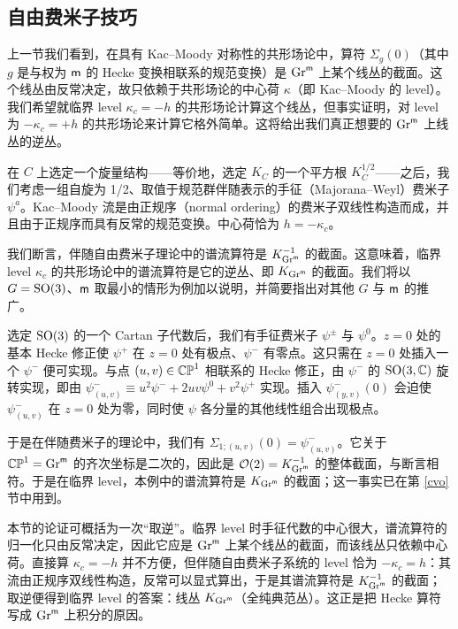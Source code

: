 \subsection{自由费米子技巧}\label{fft}

上一节我们看到，在具有 Kac--Moody 对称性的共形场论中，算符 $\Sigma_g(0)$（其中 $g$ 是与权为 ${\sf m}$ 的 Hecke 变换相联系的规范变换）是 ${\mathrm{Gr}}^{\sf m}$ 上某个线丛的截面。这个线丛由反常决定，故只依赖于共形场论的中心荷 $\kappa$（即 Kac--Moody 的 level）。我们希望就临界 level $\kappa_c=-h$ 的共形场论计算这个线丛，但事实证明，对 level 为 $-\kappa_c=+h$ 的共形场论来计算它格外简单。这将给出我们真正想要的 ${\mathrm{Gr}}^{\sf m}$ 上线丛的逆丛。
 
在 $C$ 上选定一个旋量结构——等价地，选定 $K_C$ 的一个平方根 $K_C^{1/2}$——之后，我们考虑一组自旋为 1/2、取值于规范群伴随表示的手征（Majorana--Weyl）费米子 $\psi^a$。Kac--Moody 流是由正规序（normal ordering）的费米子双线性构造而成，并且由于正规序而具有反常的规范变换。中心荷恰为 $h=-\kappa_c$。

我们断言，伴随自由费米子理论中的谱流算符是 $K^{-1}_{{\mathrm{Gr}}^{\sf m}}$ 的截面。这意味着，临界 level $\kappa_c$ 的共形场论中的谱流算符是它的逆丛、即 $K_{{\mathrm{Gr}}^{\sf m}}$ 的截面。我们将以 $G={\mathrm{SO}}(3)$、${\sf m}$ 取最小的情形为例加以说明，并简要指出对其他 $G$ 与 ${\sf m}$ 的推广。


选定 ${\mathrm{SO}}(3)$ 的一个 Cartan 子代数后，我们有手征费米子 $\psi^\pm$ 与 $\psi^0$。$z=0$ 处的基本 Hecke 修正使 $\psi^+$ 在 $z=0$ 处有极点、$\psi^-$ 有零点。这只需在 $z=0$ 处插入一个 $\psi^-$ 便可实现。与点 $(u,v)\in{\mathbb{CP}}^1$ 相联系的 Hecke 修正，由 $\psi^-$ 的 ${\mathrm{SO}}(3,{\mathbb C})$ 旋转实现，即由 $\psi^-_{(u,v)} \equiv u^2 \psi^-  + 2 u v \psi^0 +  v^2 \psi^+$ 实现。插入 $\psi^-_{(y,v)}(0)$ 会迫使 $\psi^-_{(u,v)}$ 在 $z=0$ 处为零，同时使 $\psi$ 各分量的其他线性组合出现极点。


于是在伴随费米子的理论中，我们有 $\Sigma_{1;(u,v)}(0) = \psi^-_{(u,v)}$。它关于 ${\mathbb{CP}}^1={\mathrm{Gr}}^{\sf m}$ 的齐次坐标是二次的，因此是 ${\mathcal O}(2) = K_{{\mathrm{Gr}}^{\sf m}}^{-1}$ 的整体截面，与断言相符。于是在临界 level，本例中的谱流算符是 $K_{{\mathrm{Gr}}^{\sf m}}$ 的截面；这一事实已在第 \ref{cvo} 节中用到。

\begin{yizhu}
本节的论证可概括为一次“取逆”。临界 level 时手征代数的中心很大，谱流算符的归一化只由反常决定，因此它应是 ${\mathrm{Gr}}^{\sf m}$ 上某个线丛的截面，而该线丛只依赖中心荷。直接算 $\kappa_c=-h$ 并不方便，但伴随自由费米子系统的 level 恰为 $-\kappa_c=h$：其流由正规序双线性构造，反常可以显式算出，于是其谱流算符是 $K^{-1}_{{\mathrm{Gr}}^{\sf m}}$ 的截面；取逆便得到临界 level 的答案：线丛 $K_{{\mathrm{Gr}}^{\sf m}}$（全纯典范丛）。这正是把 Hecke 算符写成 ${\mathrm{Gr}}^{\sf m}$ 上积分的原因。
\end{yizhu}


